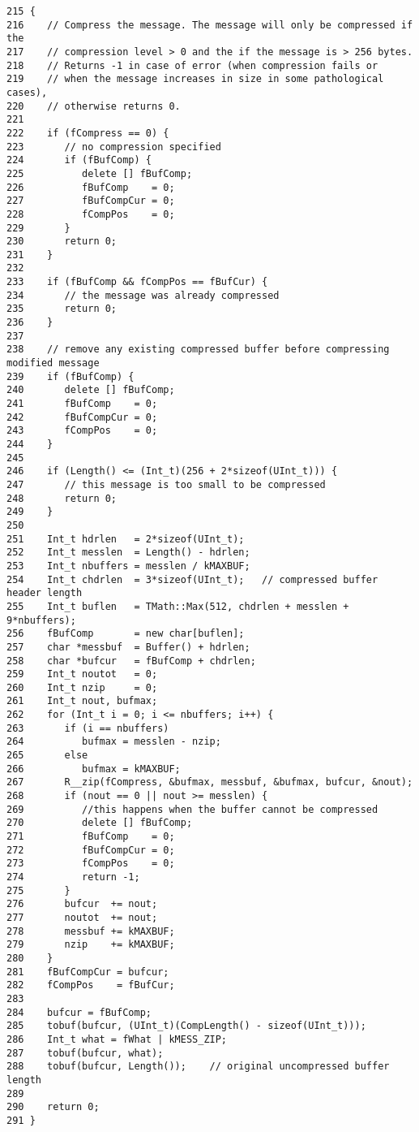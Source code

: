 \footnotesize\begin{verbatim}215 {
216    // Compress the message. The message will only be compressed if the
217    // compression level > 0 and the if the message is > 256 bytes.
218    // Returns -1 in case of error (when compression fails or
219    // when the message increases in size in some pathological cases),
220    // otherwise returns 0.
221 
222    if (fCompress == 0) {
223       // no compression specified
224       if (fBufComp) {
225          delete [] fBufComp;
226          fBufComp    = 0;
227          fBufCompCur = 0;
228          fCompPos    = 0;
229       }
230       return 0;
231    }
232 
233    if (fBufComp && fCompPos == fBufCur) {
234       // the message was already compressed
235       return 0;
236    }
237 
238    // remove any existing compressed buffer before compressing modified message
239    if (fBufComp) {
240       delete [] fBufComp;
241       fBufComp    = 0;
242       fBufCompCur = 0;
243       fCompPos    = 0;
244    }
245 
246    if (Length() <= (Int_t)(256 + 2*sizeof(UInt_t))) {
247       // this message is too small to be compressed
248       return 0;
249    }
250 
251    Int_t hdrlen   = 2*sizeof(UInt_t);
252    Int_t messlen  = Length() - hdrlen;
253    Int_t nbuffers = messlen / kMAXBUF;
254    Int_t chdrlen  = 3*sizeof(UInt_t);   // compressed buffer header length
255    Int_t buflen   = TMath::Max(512, chdrlen + messlen + 9*nbuffers);
256    fBufComp       = new char[buflen];
257    char *messbuf  = Buffer() + hdrlen;
258    char *bufcur   = fBufComp + chdrlen;
259    Int_t noutot   = 0;
260    Int_t nzip     = 0;
261    Int_t nout, bufmax;
262    for (Int_t i = 0; i <= nbuffers; i++) {
263       if (i == nbuffers)
264          bufmax = messlen - nzip;
265       else
266          bufmax = kMAXBUF;
267       R__zip(fCompress, &bufmax, messbuf, &bufmax, bufcur, &nout);
268       if (nout == 0 || nout >= messlen) {
269          //this happens when the buffer cannot be compressed
270          delete [] fBufComp;
271          fBufComp    = 0;
272          fBufCompCur = 0;
273          fCompPos    = 0;
274          return -1;
275       }
276       bufcur  += nout;
277       noutot  += nout;
278       messbuf += kMAXBUF;
279       nzip    += kMAXBUF;
280    }
281    fBufCompCur = bufcur;
282    fCompPos    = fBufCur;
283 
284    bufcur = fBufComp;
285    tobuf(bufcur, (UInt_t)(CompLength() - sizeof(UInt_t)));
286    Int_t what = fWhat | kMESS_ZIP;
287    tobuf(bufcur, what);
288    tobuf(bufcur, Length());    // original uncompressed buffer length
289 
290    return 0;
291 }
\end{verbatim}\normalsize 


